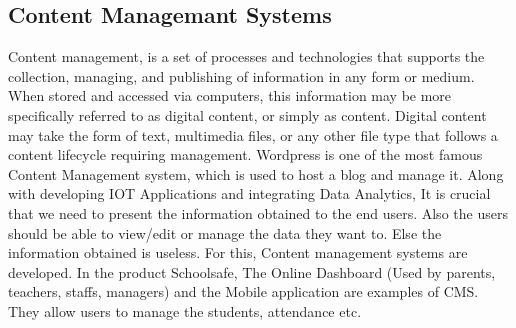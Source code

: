 \documentclass[a4paper,12pt]{report}
\begin{document}
			\subsection{Content Managemant Systems}
			Content management, is a set of processes and technologies that supports the collection, managing, and publishing of information in any form or medium. When stored and accessed via computers, this information may be more specifically referred to as digital content, or simply as content. Digital content may take the form of text, multimedia files, or any other file type that follows a content lifecycle requiring management. Wordpress is one of the most famous Content Management system, which is used to host a blog and manage it.
			Along with developing IOT Applications and integrating Data Analytics, It is crucial that we need to present the information obtained to the end users. Also the users should be able to view/edit or manage the data they want to. Else the information obtained is useless. For this, Content management systems are developed. In the product Schoolsafe, The Online Dashboard (Used by parents, teachers, staffs, managers) and the Mobile application are examples of CMS. They allow users to manage the students, attendance etc.
	
\end{document}
